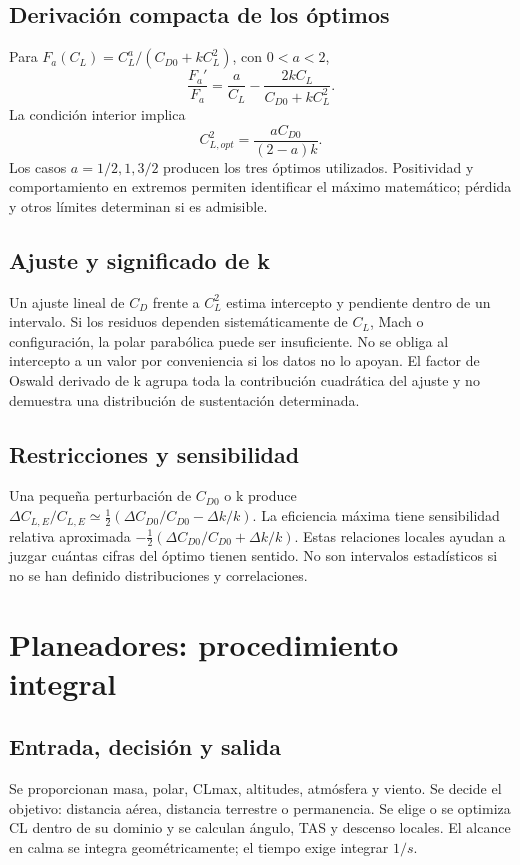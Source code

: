 \section{Derivación compacta de los óptimos}
Para $F_a(C_L)=C_L^a/(C_{D0}+kC_L^2)$, con $0<a<2$,
\begin{equation}
\frac{F_a'}{F_a}=\frac a{C_L}-\frac{2kC_L}{C_{D0}+kC_L^2}.
\end{equation}
La condición interior implica
\begin{equation}
C_{L,opt}^2=\frac{aC_{D0}}{(2-a)k}.
\end{equation}
Los casos $a=1/2,1,3/2$ producen los tres óptimos utilizados. Positividad y comportamiento en extremos permiten identificar el máximo matemático; pérdida y otros límites determinan si es admisible.

\section{Ajuste y significado de k}
Un ajuste lineal de $C_D$ frente a $C_L^2$ estima intercepto y pendiente dentro de un intervalo. Si los residuos dependen sistemáticamente de $C_L$, Mach o configuración, la polar parabólica puede ser insuficiente. No se obliga al intercepto a un valor por conveniencia si los datos no lo apoyan. El factor de Oswald derivado de k agrupa toda la contribución cuadrática del ajuste y no demuestra una distribución de sustentación determinada.

\section{Restricciones y sensibilidad}
Una pequeña perturbación de $C_{D0}$ o k produce $\Delta C_{L,E}/C_{L,E}\simeq\tfrac12(\Delta C_{D0}/C_{D0}-\Delta k/k)$. La eficiencia máxima tiene sensibilidad relativa aproximada $-\tfrac12(\Delta C_{D0}/C_{D0}+\Delta k/k)$. Estas relaciones locales ayudan a juzgar cuántas cifras del óptimo tienen sentido. No son intervalos estadísticos si no se han definido distribuciones y correlaciones.

\chapter{Planeadores: procedimiento integral}
\section{Entrada, decisión y salida}
Se proporcionan masa, polar, CLmax, altitudes, atmósfera y viento. Se decide el objetivo: distancia aérea, distancia terrestre o permanencia. Se elige o se optimiza CL dentro de su dominio y se calculan ángulo, TAS y descenso locales. El alcance en calma se integra geométricamente; el tiempo exige integrar $1/s$.

